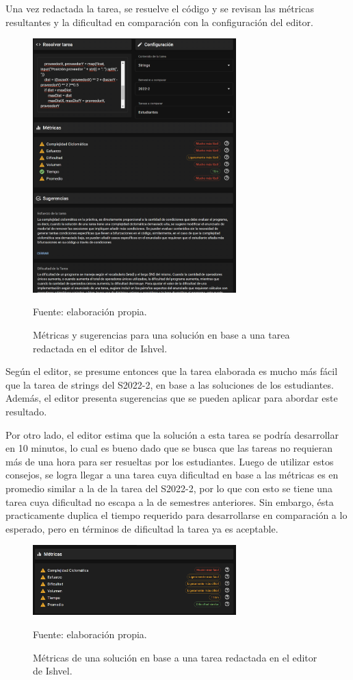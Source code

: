 \documentclass[letterpaper,12pt]{article}
\begin{document}
Una vez redactada la tarea, se resuelve el código y se revisan las métricas resultantes y la dificultad en comparación con la configuración del editor.
\begin{figure}[H]
  \centering
  \includegraphics[width=0.7\textwidth]{figures/redact5.png}
  \caption{Métricas y sugerencias para una solución en base a una tarea redactada en el editor de Ishvel.} Fuente: elaboración propia.
  \label{img:redact5}
\end{figure}
Según el editor, se presume entonces que la tarea elaborada es mucho más fácil que la tarea de strings del S2022-2, en base a las soluciones de los estudiantes. Además, el editor presenta sugerencias que se pueden aplicar para abordar este resultado.

Por otro lado, el editor estima que la solución a esta tarea se podría desarrollar en 10 minutos, lo cual es bueno dado que se busca que las tareas no requieran más de una hora para ser resueltas por los estudiantes. Luego de utilizar estos consejos, se logra llegar a una tarea cuya dificultad en base a las métricas es en promedio similar a la de la tarea del S2022-2, por lo que con esto se tiene una tarea cuya dificultad no escapa a la de semestres anteriores. Sin embargo, ésta practicamente duplica el tiempo requerido para desarrollarse en comparación a lo esperado, pero en términos de dificultad la tarea ya es aceptable.
\begin{figure}[H]
  \centering
  \includegraphics[width=0.7\textwidth]{figures/redact6.png}
  \caption{Métricas de una solución en base a una tarea redactada en el editor de Ishvel.} Fuente: elaboración propia.
  \label{img:redact6}
\end{figure}
\end{document}
